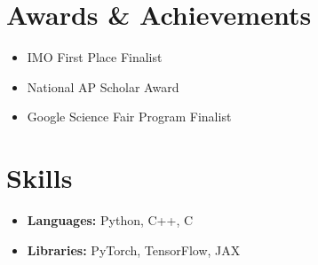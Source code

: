 \documentclass[a4paper,20pt]{article}
\newcommand{\resumeItem}[2]{
  \item\small{
    \textbf{#1}{#2 \vspace{-2pt}}
  }
}
\newcommand{\resumeSubItem}[2]{\resumeItem{#1}{#2}\vspace{-3pt}}
\newcommand{\resumeSubHeadingListStart}{\begin{itemize}[label={}, leftmargin=5.0mm]}
\newcommand{\resumeSubHeadingListEnd}{\end{itemize}}
\begin{document}
\vspace{-9pt}
\section{Awards \& Achievements}
\begin{itemize}
    \item IMO First Place Finalist
    \vspace{-5pt}
    \item National AP Scholar Award
    \vspace{-5pt}
    \item Google Science Fair Program Finalist
\end{itemize}
\vspace{-9pt}
\section{Skills}
\resumeSubHeadingListStart
\resumeSubItem{Languages: }{Python, C++, C}
\resumeSubItem{Libraries: }{PyTorch, TensorFlow, JAX}
\resumeSubHeadingListEnd
\end{document}
